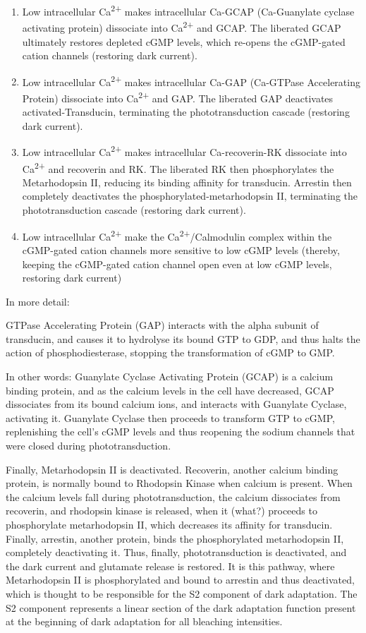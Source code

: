\documentclass[]{book}
\providecommand{\tightlist}{%
  \setlength{\itemsep}{0pt}\setlength{\parskip}{0pt}}
\begin{document}
\begin{enumerate}
\def\labelenumi{\arabic{enumi}.}
\tightlist
\item
  Low intracellular Ca\textsuperscript{2+} makes intracellular Ca-GCAP (Ca-Guanylate cyclase activating protein) dissociate into Ca\textsuperscript{2+} and GCAP. The liberated GCAP ultimately restores depleted cGMP levels, which re-opens the cGMP-gated cation channels (restoring dark current).
\item
  Low intracellular Ca\textsuperscript{2+} makes intracellular Ca-GAP (Ca-GTPase Accelerating Protein) dissociate into Ca\textsuperscript{2+} and GAP. The liberated GAP deactivates activated-Transducin, terminating the phototransduction cascade (restoring dark current).
\item
  Low intracellular Ca\textsuperscript{2+} makes intracellular Ca-recoverin-RK dissociate into Ca\textsuperscript{2+} and recoverin and RK. The liberated RK then phosphorylates the Metarhodopsin II, reducing its binding affinity for transducin. Arrestin then completely deactivates the phosphorylated-metarhodopsin II, terminating the phototransduction cascade (restoring dark current).
\item
  Low intracellular Ca\textsuperscript{2+} make the Ca\textsuperscript{2+}/Calmodulin complex within the cGMP-gated cation channels more sensitive to low cGMP levels (thereby, keeping the cGMP-gated cation channel open even at low cGMP levels, restoring dark current)
\end{enumerate}

In more detail:

GTPase Accelerating Protein (GAP) interacts with the alpha subunit of transducin, and causes it to hydrolyse its bound GTP to GDP, and thus halts the action of phosphodiesterase, stopping the transformation of cGMP to GMP.

In other words: Guanylate Cyclase Activating Protein (GCAP) is a calcium binding protein, and as the calcium levels in the cell have decreased, GCAP dissociates from its bound calcium ions, and interacts with Guanylate Cyclase, activating it. Guanylate Cyclase then proceeds to transform GTP to cGMP, replenishing the cell's cGMP levels and thus reopening the sodium channels that were closed during phototransduction.

Finally, Metarhodopsin II is deactivated. Recoverin, another calcium binding protein, is normally bound to Rhodopsin Kinase when calcium is present. When the calcium levels fall during phototransduction, the calcium dissociates from recoverin, and rhodopsin kinase is released, when it (what?) proceeds to phosphorylate metarhodopsin II, which decreases its affinity for transducin. Finally, arrestin, another protein, binds the phosphorylated metarhodopsin II, completely deactivating it. Thus, finally, phototransduction is deactivated, and the dark current and glutamate release is restored. It is this pathway, where Metarhodopsin II is phosphorylated and bound to arrestin and thus deactivated, which is thought to be responsible for the S2 component of dark adaptation. The S2 component represents a linear section of the dark adaptation function present at the beginning of dark adaptation for all bleaching intensities.
\end{document}
